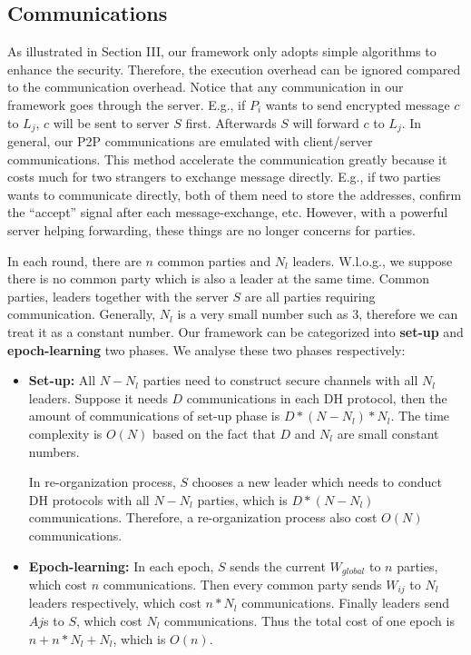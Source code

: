 \subsection{Communications}
As illustrated in Section III, our framework only adopts simple algorithms to enhance the security. Therefore, the execution overhead can be ignored compared to the communication overhead. Notice that any communication in our framework goes through the server. E.g., if $P_i$ wants to send encrypted message $c$ to $L_j$, $c$ will be sent to server $S$ first. Afterwards $S$ will forward $c$ to $L_j$. In general, our P2P communications are emulated with client/server communications. This method accelerate the communication greatly because it costs much for two strangers to exchange message directly. E.g., if two parties wants to communicate directly, both of them need to store the addresses, confirm the ``accept'' signal after each message-exchange, etc. However, with a powerful server helping forwarding, these things are no longer concerns for parties.

In each round, there are $n$ common parties and $N_l$ leaders. W.l.o.g., we suppose there is no common party which is also a leader at the same time. Common parties, leaders together with the server $S$ are all parties requiring communication. Generally, $N_l$ is a very small number such as 3, therefore we can treat it as a constant number. Our framework can be categorized into \textbf{set-up} and \textbf{epoch-learning} two phases. We analyse these two phases respectively:

\begin{itemize}
    \item \textbf{Set-up:} All $N-N_l$ parties need to construct secure channels with all $N_l$ leaders. Suppose it needs $D$ communications in each DH protocol, then the amount of communications of set-up phase is $D * (N-N_l) * N_l$. The time complexity is $O(N)$ based on the fact that $D$ and $N_l$ are small constant numbers.
    
    In re-organization process, $S$ chooses a new leader which needs to conduct DH protocols with all $N-N_l$ parties, which is $D * (N-N_l)$ communications. Therefore, a re-organization process also cost $O(N)$ communications.
    
    \item \textbf{Epoch-learning:} In each epoch, $S$ sends the current $W_{global}$ to $n$ parties, which cost $n$ communications. Then every common party sends $W_{ij}$ to $N_l$ leaders respectively, which cost $n * N_l$ communications. Finally leaders send $Aj$s to $S$, which cost $N_l$ communications. Thus the total cost of one epoch is $n + n * N_l + N_l$, which is $O(n)$.
\end{itemize}

